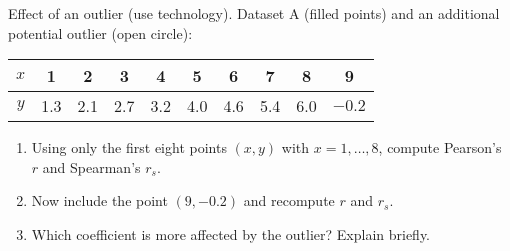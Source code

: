 \documentclass[11pt]{article}
\def\textbf#1{#1}%
\newcounter{question}
\begin{document}
\begin{question}
\textbf{Effect of an outlier (use technology).}
Dataset A (filled points) and an additional potential outlier (open circle):
\begin{center}
\begin{tabular}{c|cccccccc|c}
$x$ & 1 & 2 & 3 & 4 & 5 & 6 & 7 & 8 & 9\\\hline
$y$ & 1.3 & 2.1 & 2.7 & 3.2 & 4.0 & 4.6 & 5.4 & 6.0 & $-0.2$
\end{tabular}
\end{center}
\begin{enumerate}
  \item Using only the first eight points $(x, y)$ with $x=1,\dots,8$, compute Pearson’s $r$ and Spearman’s $r_s$.
  \item Now include the point $(9,-0.2)$ and recompute $r$ and $r_s$.
  \item Which coefficient is more affected by the outlier? Explain briefly.
\end{enumerate}
\begin{center}
\end{center}
\end{question}
\end{document}

